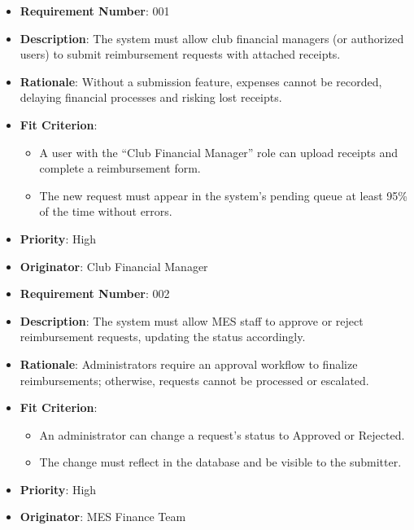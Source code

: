 \documentclass[12pt]{article}
\begin{document}
\begin{itemize}

  \item \textbf{Requirement Number}: 001  
  \item \textbf{Description}: The system must allow club financial managers (or authorized users) to submit reimbursement requests with attached receipts.  
  \item \textbf{Rationale}: Without a submission feature, expenses cannot be recorded, delaying financial processes and risking lost receipts.  
  \item \textbf{Fit Criterion}:  
  \begin{itemize}
    \item A user with the “Club Financial Manager” role can upload receipts and complete a reimbursement form.
    \item The new request must appear in the system’s pending queue at least 95\% of the time without errors.
  \end{itemize}
  \item \textbf{Priority}: High  
  \item \textbf{Originator}: Club Financial Manager
  
  \bigskip

  \item \textbf{Requirement Number}: 002  
  \item \textbf{Description}: The system must allow MES staff to approve or reject reimbursement requests, updating the status accordingly.  
  \item \textbf{Rationale}: Administrators require an approval workflow to finalize reimbursements; otherwise, requests cannot be processed or escalated.  
  \item \textbf{Fit Criterion}:  
  \begin{itemize}
    \item An administrator can change a request’s status to Approved or Rejected.
    \item The change must reflect in the database and be visible to the submitter.
  \end{itemize}
  \item \textbf{Priority}: High  
  \item \textbf{Originator}: MES Finance Team

  \bigskip


\end{itemize}
\end{document}
